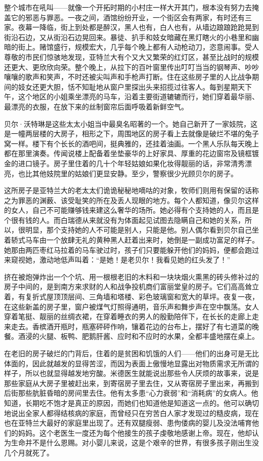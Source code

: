 \par 整个城市在吼叫——就像一个开拓时期的小村庄一样大开其门，根本没有努力去掩盖它的邪恶与罪恶。一夜之间，酒馆纷纷开业，一个街区会有两家，有时还有三家。夜幕一降临，街上到处都是醉汉，黑人也有，白人也有，从墙边踉踉跄跄晃到街沿石边，又从街沿石边晃回来。暴徒、扒手和妓女暗藏在黑灯瞎火的小巷里和幽暗的街上。赌馆盛行，规模宏大，几乎每个晚上都有人动枪动刀，恣意闹事。受人尊敬的市民们惊骇地发现，亚特兰大有个又大又繁荣的红灯区，甚至比战时的规模还更大、更欣欣向荣。整个晚上，从拉下的百叶窗里传出叮叮当当的钢琴声、吵吵嚷嚷的歌声和笑声，不时还被尖叫声和手枪声打断。住在这些房子里的人比战争期间的妓女还更大胆，恬不知耻地从窗户里探出头来招揽过往客人。每到星期天下午，这个地区的小姐乘坐漂亮的马车，沿着主要街道辘辘而行，她们穿着最华丽、最漂亮的衣服，在放下来的丝制窗帘后面呼吸着新鲜空气。
\par 贝尔·沃特琳是这些太太小姐当中最臭名昭著的一个。她自己新开了一家妓院，这是一幢两层楼的大房子，相形之下，周围地区的房子看上去就像是破烂不堪的兔子窝一样。楼下有个长长的酒吧间，挺典雅的，还挂着油画。一个黑人乐队每天晚上都在那里演奏。传闻说楼上配备着坐垫豪华的上好家具、厚重的花边窗帘及镜框镀金的进口镜子。房子里住着的几十个年轻姑娘如果化妆得靓丽的话，非常清秀漂亮，也比其他妓院里的姑娘们更显安静。至少，警察很少光顾贝尔的房子。
\par 这所房子是亚特兰大的老太太们诡诡秘秘地嘀咕的对象，牧师们则用有保留的话称之为罪恶的渊薮、该受耻笑的所在及丢人现眼的地方。每个人都知道，像贝尔这样的女人，自己不可能赚够钱来建这么奢华的场所。她必得有个支持她的人，而且是个很有钱的人。而白瑞德从来就没有为体面起见试图去隐瞒自己和她的关系，所以，很明显，那个支持她的人不可能是别人，只能是他。别人偶尔看到贝尔自己坐着轿式马车由一个放肆无礼的黄种黑人赶着出来时，她倒是一副成功富足的样子。她那由两匹枣红马拉着的马车驶过时，孩子们只要能躲开他们的妈妈，便都会跑过来窥视她，激动地低声叫着：“是她！是老贝尔！我看见她的红头发了！”
\par 挤在被炮弹炸出一个个坑、用一根根老旧的木料和一块块烟火熏黑的砖头修补过的房子中间的，是到南方来求财的人和战争投机商们富丽堂皇的房子。它们高高耸立着，有复折式屋顶顶层间、三角墙和塔楼、彩色玻璃窗和宽大的草坪。夜复一夜，在这些新盖的房子里，窗户被煤气灯照得通明，音乐声和舞步声在空中飘荡。女人穿着笔挺、靓丽的丝绸衣裙，在穿着睡衣的男人的殷勤陪伴下，在长长的走廊上走来走去。香槟酒开瓶时，瓶塞砰砰作响，镶着花边的台布上，摆好了有七道菜的晚餐。酒浸的火腿、板鸭、肥鹅肝酱、应时和不应时的水果，全都丰盛地摆在桌上。
\par 在老旧的房子破烂的门背后，住着的是贫困和饥饿的人们——他们的出身可是无比体面的，因此就越发的显得苦涩，而因为表面上傲慢地显露出对物质需求无所谓的样子，所以也就显得越发地穷酸。米德医生就能说出那些令人厌烦的故事来，说是那些家庭从大房子里被赶出来，到寄宿房子里去住，又从寄宿房子里出来，再搬到后街那些肮脏昏暗的房间里去住。他有太多患“心力衰弱”和“消耗病”的女病人。他知道，长期吃不饱才是真正的原因，而她们也知道他是知道这一点的。他可以确切地说出全家人都得结核病的家庭，而曾经只在穷苦白人家才发现过的糙皮病，现在也在亚特兰大最好的家庭里出现了。还有双腿瘦弱、患佝偻病的婴儿及没法哺育他们的妈妈。这个老医生一度还为每个他接生的孩子虔敬地感谢上帝。现在，他却认为生命并不是什么恩赐。对小婴儿来说，这是个艰辛的世界，有很多孩子刚出生没几个月就死了。
